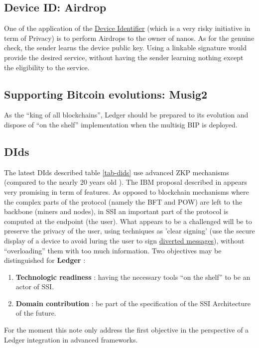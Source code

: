 \documentclass[11pt]{llncs2e/llncs}
\begin{document}
\subsection{Device ID: Airdrop} One of the application of the \href{https://ledgerhq.atlassian.net/wiki/spaces/TA/pages/3557261398/ARCH+DRAFT+Device+identification}{Device Identifier} (which is a very risky initiative in term of Privacy) is to perform Airdrops to the owner of nanos. As for the genuine check, the sender learns the device public key. Using a linkable signature  would provide the desired service, without having the sender learning nothing except the eligibility to the service.

\subsection{Supporting Bitcoin evolutions: Musig2}

As the ``king of all blockchains'', Ledger should be prepared to its evolution and dispose of ``on the shelf'' implementation when the multisig BIP is deployed. 


\subsection{DIds}

 The latest DIds described table \ref{tab-dids} use advanced ZKP mechanisms (compared to the nearly 20 years old \cite{CL02}). The IBM proposal described in \cite{ElkhiyaouiCA21} appears very promising in term of features. As opposed to blockchain mechanisms where the complex parts of the protocol (namely the BFT and POW) are left to the backbone (miners and nodes), in SSI an important part of the protocol is computed at the endpoint (the user). What appears to be a challenged will be to preserve the privacy of the user, using techniques as 'clear signing' (use the secure display of a device to avoid luring the user to sign \href{https://www.ledger.com/academy/cryptos-greatest-weakness-blind-signing-explained}{diverted messages}), without ``overloading'' them with too much information.  
Two objectives may be distinguished for {\bf \textregistered Ledger} :
\begin{enumerate}
 \item {\bf Technologic readiness} : having the necessary tools ``on the shelf'' to be an actor of SSI.
 \item {\bf Domain contribution} : be part of the specification of the  SSI Architecture of the future.
\end{enumerate}
For the moment this note only address the first objective in the perspective of a Ledger integration in advanced frameworks.
 
\end{document}
